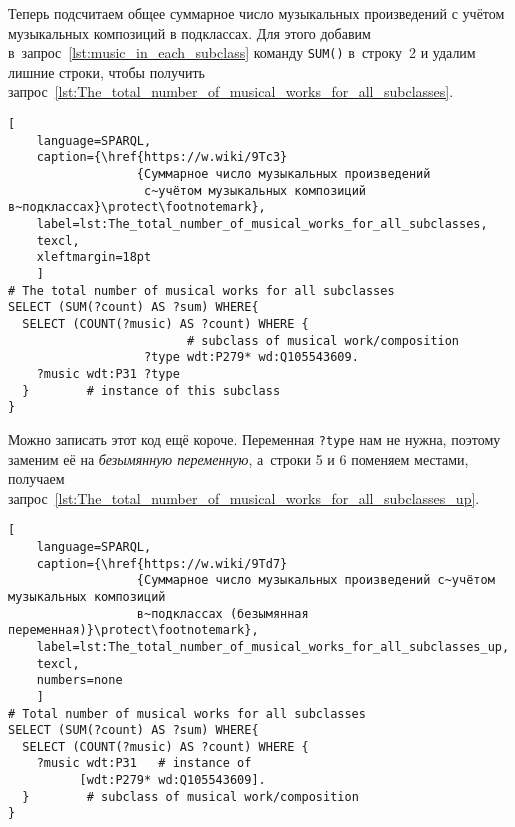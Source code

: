 Теперь подсчитаем общее суммарное число музыкальных произведений с учётом музыкальных композиций в подклассах. Для этого добавим в~запрос~\ref{lst:music_in_each_subclass} команду \lstinline|SUM()| в~строку~2 и удалим лишние строки, чтобы получить запрос~\ref{lst:The_total_number_of_musical_works_for_all_subclasses}.


\begin{lstlisting}[ 
    language=SPARQL,
    caption={\href{https://w.wiki/9Tc3}
                  {Суммарное число музыкальных произведений 
                   с~учётом музыкальных композиций в~подклассах}\protect\footnotemark},
    label=lst:The_total_number_of_musical_works_for_all_subclasses,
    texcl,  
    xleftmargin=18pt
    ]
# The total number of musical works for all subclasses 
SELECT (SUM(?count) AS ?sum) WHERE{
  SELECT (COUNT(?music) AS ?count) WHERE {
                         # subclass of musical work/composition
                   ?type wdt:P279* wd:Q105543609.
    ?music wdt:P31 ?type
  }        # instance of this subclass
}
\end{lstlisting}%

Можно записать этот код ещё короче. 
Переменная \lstinline|?type| нам не нужна, 
поэтому заменим её на \emph{безымянную переменную}, 
а~строки 5 и 6 поменяем местами, 
получаем запрос~\ref{lst:The_total_number_of_musical_works_for_all_subclasses_up}.

\begin{lstlisting}[ 
    language=SPARQL,
    caption={\href{https://w.wiki/9Td7}
                  {Суммарное число музыкальных произведений с~учётом музыкальных композиций 
                  в~подклассах (безымянная переменная)}\protect\footnotemark},
    label=lst:The_total_number_of_musical_works_for_all_subclasses_up,
    texcl,
    numbers=none
    ]
# Total number of musical works for all subclasses
SELECT (SUM(?count) AS ?sum) WHERE{
  SELECT (COUNT(?music) AS ?count) WHERE {
    ?music wdt:P31   # instance of
          [wdt:P279* wd:Q105543609].
  }        # subclass of musical work/composition
}
\end{lstlisting}%

